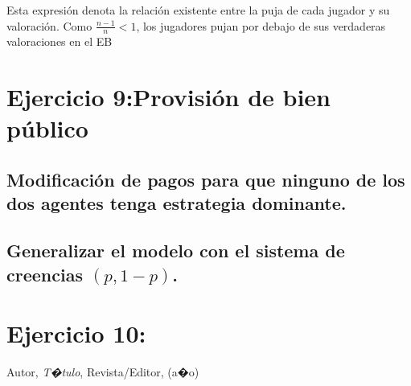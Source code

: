 \documentclass{article}
\theoremstyle{definition}
\theoremstyle{remark}
\begin{document}
Esta expresi\'on denota la relaci\'on existente entre la puja de cada jugador y su valoraci\'on. Como $\frac{n-1}{n}<1$, los jugadores pujan por debajo de sus verdaderas valoraciones en el EB

\section{Ejercicio 9:Provisi\'on de bien p\'ublico}
\subsection{Modificaci\'on de pagos para que ninguno de los dos agentes tenga estrategia dominante.}
\subsection{Generalizar el modelo con el sistema de creencias $(p,1-p)$.}
\section{Ejercicio 10:}



























































\begin{thebibliography}{99}

 Autor, \emph{T�tulo}, Revista/Editor, (a�o)

\end{thebibliography}
\end{document}
